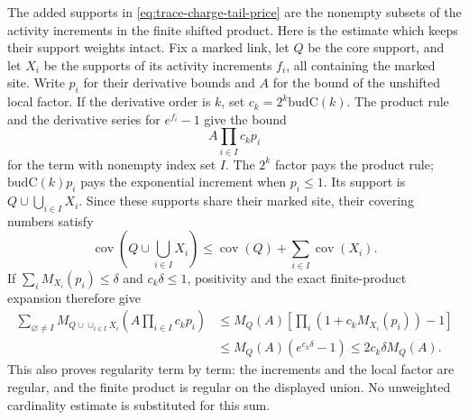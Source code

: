 The added supports in \eqref{eq:trace-charge-tail-price} are the
nonempty subsets of the activity increments in the finite shifted
product. Here is the estimate which keeps their support weights intact.
Fix a marked link, let $Q$ be the core support, and let $X_i$ be the
supports of its activity increments $f_i$, all containing the marked
site. Write $p_i$ for their derivative bounds and $A$ for the bound of
the unshifted local factor. If the derivative order is $k$, set
$c_k=2^k\mathrm{budC}(k)$. The product rule and the derivative series for
$e^{f_i}-1$ give the bound
\[
 A\prod_{i\in I}c_kp_i
\]
for the term with nonempty index set $I$. The $2^k$ factor pays the
product rule; $\mathrm{budC}(k)p_i$ pays the exponential increment when
$p_i\le1$. Its support is $Q\cup\bigcup_{i\in I}X_i$. Since these
supports share their marked site, their covering numbers satisfy
\[
 \operatorname{cov}(Q\cup\bigcup_{i\in I}X_i)
 \le\operatorname{cov}(Q)+\sum_{i\in I}\operatorname{cov}(X_i).
\]
If $\sum_i M_{X_i}(p_i)\le\delta$ and $c_k\delta\le1$, positivity
and the exact finite-product expansion therefore give
\begin{align*}
 \sum_{\varnothing\ne I}M_{Q\cup\cup_{i\in I}X_i}
       (A\prod_{i\in I}c_kp_i)
 &\le M_Q(A)\left[\prod_i(1+c_kM_{X_i}(p_i))-1\right]\\
 &\le M_Q(A)(e^{c_k\delta}-1)
 \le2c_k\delta M_Q(A).
\end{align*}
This also proves regularity term by term: the increments and the local
factor are regular, and the finite product is regular on the displayed
union. No unweighted cardinality estimate is substituted for this sum.

